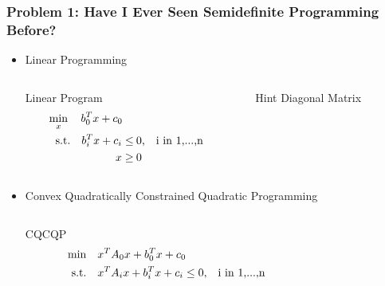 \documentclass[11pt]{beamer}
\begin{document}
	\begin{frame}
		\frametitle{Problem 1: \newline Have I Ever Seen Semidefinite Programming Before?}
		\begin{itemize}[leftmargin=-0.3cm]
		\item Linear Programming\\
		\begin{columns}
			\begin{column}{0.5\textwidth}
				\begin{block}{Linear Program}
					\scriptsize
					\abovedisplayskip=0pt
					\abovedisplayshortskip=0pt 
					\belowdisplayskip=0pt
					\belowdisplayshortskip=0pt 
					\begin{equation*}
					\begin{aligned}
					\min_x\quad  b_0^Tx+c_0\quad\\
					\text{s.t.}\quad  b_i^Tx+c_i\leq&  \:0\text{,\quad i in 1,...,n}\\
					 x\geq& \:0
					\end{aligned}
					\end{equation*}
				\end{block}
			\end{column}
			\begin{column}{0.5\textwidth}
				\begin{block}{Hint}
					Diagonal Matrix
				\end{block}
			\end{column}
		\end{columns}
		\item Convex Quadratically Constrained Quadratic Programming\\
		\begin{columns}
		\begin{column}{0.5\textwidth}
		\begin{block}{CQCQP}
		\scriptsize
		\abovedisplayskip=0pt
		\abovedisplayshortskip=0pt 
		\belowdisplayskip=0pt
		\belowdisplayshortskip=0pt 
		\begin{equation*}
		\begin{aligned}
		\min\quad &x^TA_0x+b_0^Tx+c_0\\
		\text{s.t.}\quad &x^TA_ix+b_i^Tx+c_i\leq 0\text{,\quad i in 1,...,n}
		\end{aligned}
		\end{equation*}
		\end{block}
		\end{column}
		\begin{column}{0.5\textwidth}

\end{column}
\end{columns}
\end{itemize}
\end{frame}
\end{document}
